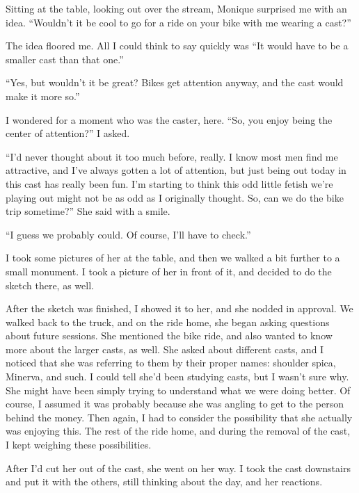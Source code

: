 Sitting at the table, looking out over the stream, Monique surprised me with an idea.
``Wouldn't it be cool to go for a ride on your bike with me wearing a cast?''

The idea floored me. All I could think to say quickly was ``It would have to be a smaller
cast than that one.''

``Yes, but wouldn't it be great? Bikes get attention anyway, and the cast would make it more
so.''

I wondered for a moment who was the caster, here. ``So, you enjoy being the center of
attention?'' I asked.

``I'd never thought about it too much before, really. I know most men find me attractive,
and I've always gotten a lot of attention, but just being out today in this cast has really been
fun. I'm starting to think this odd little fetish we're playing out might not be as odd as I
originally thought. So, can we do the bike trip sometime?'' She said with a smile.

``I guess we probably could. Of course, I'll have to check.''

I took some pictures of her at the table, and then we walked a bit further to a small
monument. I took a picture of her in front of it, and decided to do the sketch there, as well.

After the sketch was finished, I showed it to her, and she nodded in approval. We walked
back to the truck, and on the ride home, she began asking questions about future sessions. She
mentioned the bike ride, and also wanted to know more about the larger casts, as well. She asked
about different casts, and I noticed that she was referring to them by their proper names:
shoulder spica, Minerva, and such. I could tell she'd been studying casts, but I wasn't sure
why. She might have been simply trying to understand what we were doing better. Of course, I
assumed it was probably because she was angling to get to the person behind the money. Then
again, I had to consider the possibility that she actually was enjoying this. The rest of the
ride home, and during the removal of the cast, I kept weighing these possibilities.

After I'd cut her out of the cast, she went on her way. I took the cast downstairs and put
it with the others, still thinking about the day, and her reactions.
